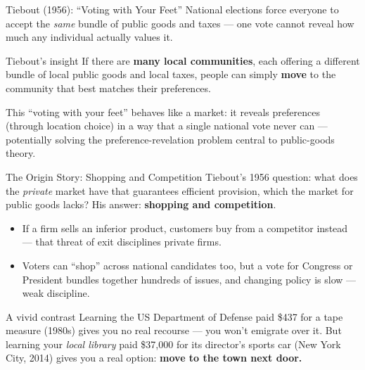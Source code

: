 \documentclass[11pt,aspectratio=169]{beamer}
\begin{document}
\begin{frame}{Tiebout (1956): ``Voting with Your Feet''}
  National elections force everyone to accept the \emph{same} bundle of public goods and taxes --- one vote cannot reveal how much any individual actually values it.
  \begin{block}{Tiebout's insight}
    If there are \textbf{many local communities}, each offering a different bundle of local public goods and local taxes, people can simply \textbf{move} to the community that best matches their preferences.
  \end{block}
  \vspace{0.4em}
  \small This ``voting with your feet'' behaves like a market: it reveals preferences (through location choice) in a way that a single national vote never can --- potentially solving the preference-revelation problem central to public-goods theory.
\end{frame}

\begin{frame}{The Origin Story: Shopping and Competition}
  \small
  Tiebout's 1956 question: what does the \emph{private} market have that guarantees efficient provision, which the market for public goods lacks? His answer: \textbf{shopping and competition}.
  \begin{itemize}
    \item If a firm sells an inferior product, customers buy from a competitor instead --- that threat of exit disciplines private firms.
    \item Voters can ``shop'' across national candidates too, but a vote for Congress or President bundles together hundreds of issues, and changing policy is slow --- weak discipline.
  \end{itemize}
  \begin{alertblock}{A vivid contrast}
    Learning the US Department of Defense paid \$437 for a tape measure (1980s) gives you no real recourse --- you won't emigrate over it. But learning your \emph{local library} paid \$37,000 for its director's sports car (New York City, 2014) gives you a real option: \textbf{move to the town next door.}
  \end{alertblock}
\end{frame}
\end{document}
